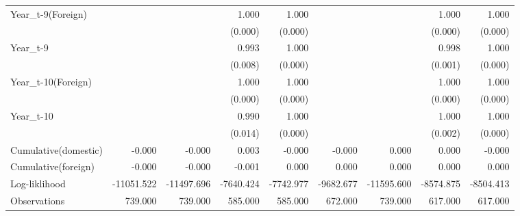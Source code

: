 \begin{table}[htbp]
\begin{tabular}{l*{8}{D{.}{.}{-1}}}
Year\_t-9(Foreign)&                     &                     &       1.000\sym{***}&       1.000\sym{\%}  &                     &                     &       1.000         &       1.000         \\
            &                     &                     &     (0.000)         &     (0.000)         &                     &                     &     (0.000)         &     (0.000)         \\
Year\_t-9    &                     &                     &       0.993         &       1.000\sym{\%}  &                     &                     &       0.998         &       1.000         \\
            &                     &                     &     (0.008)         &     (0.000)         &                     &                     &     (0.001)         &     (0.000)         \\
Year\_t-10(Foreign)&                     &                     &       1.000         &       1.000         &                     &                     &       1.000         &       1.000         \\
            &                     &                     &     (0.000)         &     (0.000)         &                     &                     &     (0.000)         &     (0.000)         \\
Year\_t-10   &                     &                     &       0.990         &       1.000         &                     &                     &       1.000         &       1.000         \\
            &                     &                     &     (0.014)         &     (0.000)         &                     &                     &     (0.002)         &     (0.000)         \\
\midrule
Cumulative(domestic)&      -0.000         &      -0.000         &       0.003         &      -0.000         &      -0.000         &       0.000         &       0.000         &      -0.000         \\
Cumulative(foreign)&      -0.000         &      -0.000         &      -0.001         &       0.000         &       0.000         &       0.000         &       0.000         &       0.000         \\
 Log-liklihood&  -11051.522         &  -11497.696         &   -7640.424         &   -7742.977         &   -9682.677         &  -11595.600         &   -8574.875         &   -8504.413         \\
Observations&     739.000         &     739.000         &     585.000         &     585.000         &     672.000         &     739.000         &     617.000         &     617.000         \\

\end{tabular}
\end{table}
